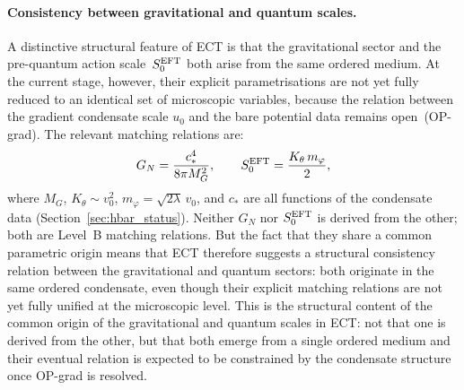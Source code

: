 \documentclass[11pt,a4paper]{article}
\numberwithin{equation}{section}
\begin{document}
\paragraph{Consistency between gravitational and quantum scales.}
A distinctive structural feature of ECT is that the gravitational
sector and the pre-quantum action scale~$S_0^{\rm EFT}$ both arise
from the same ordered medium.
At the current stage, however, their explicit parametrisations are not
yet fully reduced to an identical set of microscopic variables, because
the relation between the gradient condensate scale $u_0$ and the bare
potential data remains open~(OP-grad).
The relevant matching relations are:
\begin{equation}
  G_N = \frac{c_*^4}{8\pi M_G^2},
  \qquad
  S_0^{\rm EFT} = \frac{K_\theta\,m_\varphi}{2},
  \label{eq:GN_S0_common}
\end{equation}
where $M_G$, $K_\theta\sim v_0^2$, $m_\varphi=\sqrt{2\lambda}\,v_0$,
and $c_*$ are all functions of the condensate data
(Section~\ref{sec:hbar_status}).
Neither $G_N$ nor $S_0^{\rm EFT}$ is derived from the other; both are
Level~B matching relations.
But the fact that they share a common parametric origin means that
ECT therefore suggests a structural consistency relation between the
gravitational and quantum sectors: both originate in the same ordered
condensate, even though their explicit matching relations are not yet
fully unified at the microscopic level.
This is the structural content of the common origin of the
gravitational and quantum scales in ECT: not that one is derived from
the other, but that both emerge from a single ordered medium and their
eventual relation is expected to be constrained by the condensate
structure once OP-grad is resolved.
\end{document}
